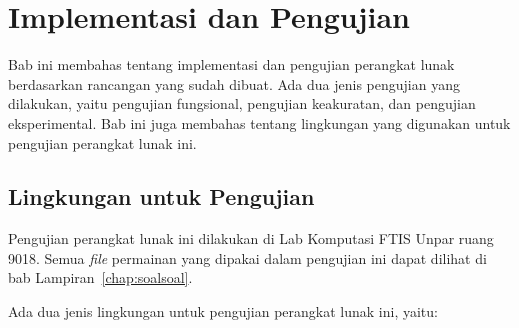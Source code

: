 \chapter{Implementasi dan Pengujian}
\label{chap:implementasipengujian}

Bab ini membahas tentang implementasi dan pengujian perangkat lunak berdasarkan rancangan yang sudah dibuat. Ada dua jenis pengujian yang dilakukan, yaitu pengujian fungsional, pengujian keakuratan, dan pengujian eksperimental. Bab ini juga membahas tentang lingkungan yang digunakan untuk pengujian perangkat lunak ini.

\section{Lingkungan untuk Pengujian}
\label{sec:lingkunganpengujian}

Pengujian perangkat lunak ini dilakukan di Lab Komputasi FTIS Unpar ruang 9018. Semua \textit{file} permainan yang dipakai dalam pengujian ini dapat dilihat di bab Lampiran~\ref{chap:soalsoal}. 

Ada dua jenis lingkungan untuk pengujian perangkat lunak ini, yaitu:

